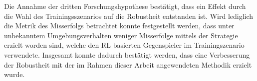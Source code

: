 Die Annahme der dritten Forschungshypothese bestätigt, dass ein Effekt durch die Wahl des Trainingsszenarios auf die Robustheit entstanden ist.
Wird lediglich die Metrik des Misserfolgs betrachtet konnte festgestellt werden, dass unter unbekanntem Umgebungsverhalten weniger Misserfolge mittels der Strategie erzielt worden sind, welche den RL basierten Gegenspieler im Trainingszenario verwendete.
Insgesamt konnte dadurch bestätigt werden, dass eine Verbesserung der Robustheit mit der im Rahmen dieser Arbeit angewendeten Methodik erzielt wurde.
